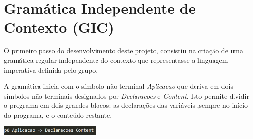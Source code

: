 \documentclass[11pt,a4paper]{report}
\begin{document}
\section{Gramática Independente de Contexto (GIC)}
O primeiro passo do desenvolvimento deste projeto, consistiu na criação de uma gramática regular independente do contexto que representasse a linguagem imperativa definida pelo grupo.\par
A gramática inicia com o símbolo não terminal \textit{Aplicacao} que deriva em dois símbolos não terminais designados por \textit{Declaracoes} e \textit{Content}. Isto permite dividir o programa em dois grandes blocos: as declarações das variáveis ,sempre no início do programa, e o conteúdo restante.\par
\begin{center}
	\includegraphics[width=50mm,scale=2]{images/blocos}
\end{center}
\end{document}
